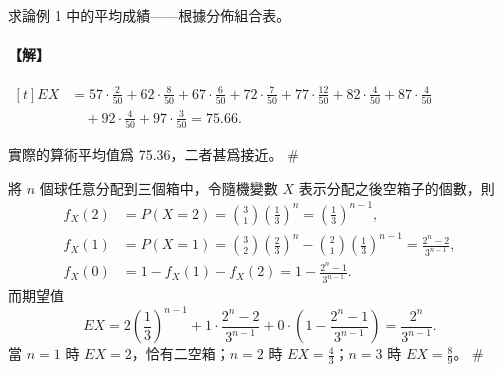 \medskip
\begin{example}\label{ex:b5-5-11}
求論例 1 中的平均成績——根據分佈組合表。
\end{example}
\paragraph{【解】}
$\begin{aligned}[t]
EX &= 57 \cdot \frac{2}{50} + 62 \cdot \frac{8}{50} + 67 \cdot \frac{6}{50} + 72 \cdot \frac{7}{50} + 77 \cdot \frac{12}{50} + 82 \cdot \frac{4}{50} + 87 \cdot \frac{4}{50} \\
&\quad + 92 \cdot \frac{4}{50} + 97 \cdot \frac{3}{50} = 75.66.
\end{aligned}$

實際的算術平均值爲 75.36，二者甚爲接近。 \hfill \#

\medskip
\begin{example}\label{ex:b5-5-12}
將 $n$ 個球任意分配到三個箱中，令隨機變數 $X$ 表示分配之後空箱子的個數，則
\begin{align*}
f_X(2) &= P(X=2) = \binom{3}{1}\left(\frac{1}{3}\right)^n = \left(\frac{1}{3}\right)^{n-1}, \\
f_X(1) &= P(X=1) = \binom{3}{2}\left(\frac{2}{3}\right)^n - \binom{2}{1}\left(\frac{1}{3}\right)^{n-1} = \frac{2^n - 2}{3^{n-1}}, \\
f_X(0) &= 1 - f_X(1) - f_X(2) = 1 - \frac{2^n - 1}{3^{n-1}}.
\end{align*}
而期望值
\[
EX = 2 \left(\frac{1}{3}\right)^{n-1} + 1 \cdot \frac{2^n - 2}{3^{n-1}} + 0 \cdot \left(1 - \frac{2^n - 1}{3^{n-1}}\right) = \frac{2^n}{3^{n-1}}.
\]
當 $n=1$ 時 $EX=2$，恰有二空箱；$n=2$ 時 $EX=\frac{4}{3}$；$n=3$ 時 $EX=\frac{8}{9}$。 \hfill \#
\end{example}

